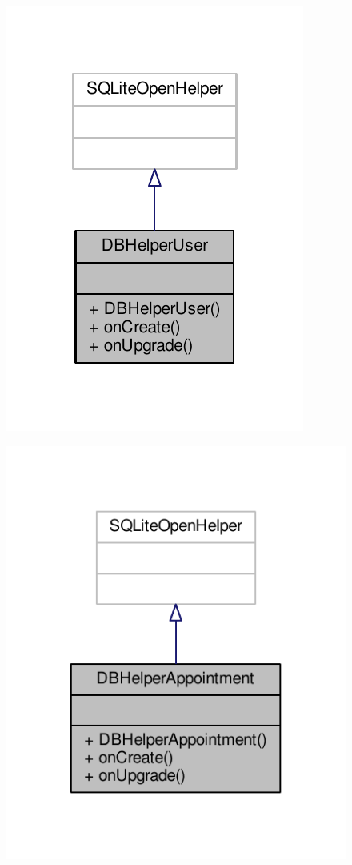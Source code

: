 \begin{figure}[H]
	\includegraphics[scale = 1]{res/umlClasses/d_b_helper_user__coll__graph.pdf}
	\centering
\end{figure}

\begin{figure}[H]
	\includegraphics[scale = 1]{res/umlClasses/d_b_helper_appointment__coll__graph.pdf}
	\centering
\end{figure}

